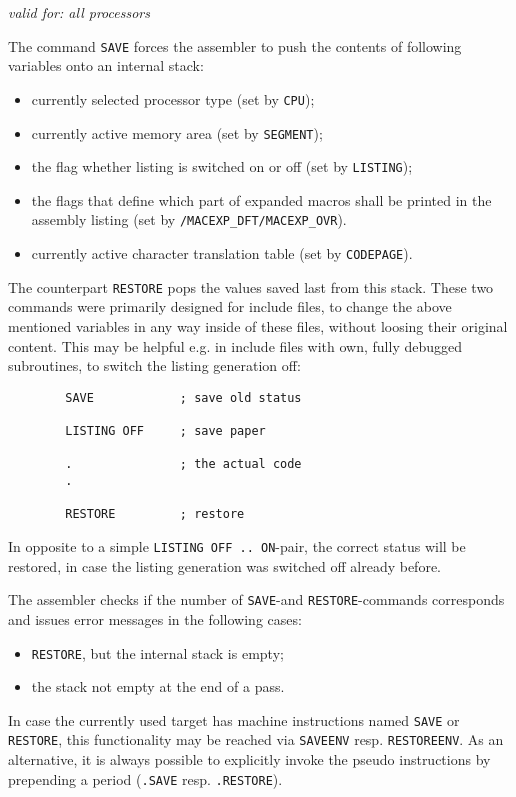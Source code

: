 \documentclass[12pt,twoside]{report}
\newcommand{\tty}[1]{{\tt #1}}
\begin{document}
{\em valid for: all processors}

The command \tty{SAVE} forces the assembler to push the contents of
following variables onto an internal stack:
\begin{itemize}
\item{currently selected processor type (set by \tty{CPU});}
\item{currently active memory area (set by \tty{SEGMENT});}
\item{the flag whether listing is switched on or off (set by \tty{LISTING});}
\item{the flags that define which part of expanded macros shall be
      printed in the assembly listing (set by
      \tty{/MACEXP\_DFT/MACEXP\_OVR}).}
\item{currently active character translation table (set by
      \tty{CODEPAGE}).}
\end{itemize}
The counterpart \tty{RESTORE} pops the values saved last from this stack.
These two commands were primarily designed for include files, to change
the above mentioned variables in any way inside of these files, without
loosing their original content.  This may be helpful e.g. in include files
with own, fully debugged subroutines, to switch the listing generation
off:
\begin{verbatim}
        SAVE            ; save old status

        LISTING OFF     ; save paper

        .               ; the actual code
        .

        RESTORE         ; restore
\end{verbatim}
In opposite to a simple \tty{LISTING OFF .. ON}-pair, the correct status
will be restored, in case the listing generation was switched off already
before.

The assembler checks if the number of \tty{SAVE}-and
\tty{RESTORE}-commands corresponds and issues error messages in the
following cases:
\begin{itemize}
\item{\tty{RESTORE}, but the internal stack is empty;}
\item{the stack not empty at the end of a pass.}
\end{itemize}
In case the currently used target has machine instructions named \tty{SAVE} or
\tty{RESTORE}, this functionality may be reached via \tty{SAVEENV} resp.
\tty{RESTOREENV}.  As an alternative, it is always possible to explicitly invoke
the pseudo instructions by prepending a period (\tty{.SAVE} resp. \tty{.RESTORE}).
\end{document}
